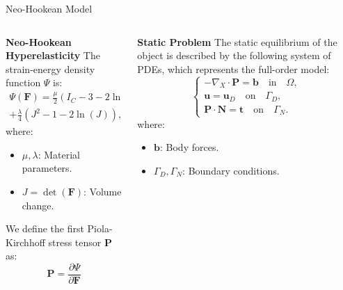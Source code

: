 \documentclass[9pt]{beamer}
\begin{document}
\begin{frame}{Neo-Hookean Model}
    \begin{columns}[T]
        \begin{column}{0.5\textwidth}
            \textbf{Neo-Hookean Hyperelasticity}
                The strain-energy density function $\Psi$ is:
                \[
\begin{split}
                        \Psi(\bm{F}) = \frac{\mu}{2} (I_C - 3 - 2\ln(J))\\ + \frac{\lambda}{4} (J^2 - 1 - 2\ln(J)),
\end{split}                \]
                where:
                \begin{itemize}
                    \item \(\mu, \lambda\): Material parameters.
                    \item \(J = \det(\bm{F})\): Volume change.
                \end{itemize}
                We define the first Piola-Kirchhoff stress tensor \(\bm{P}\) as:
                \[
                    \bm{P} = \frac{\partial \Psi}{\partial \bm{F}} 
                \]
        \end{column}
        \begin{column}{0.5\textwidth}
            \textbf{Static Problem}
                The static equilibrium of the object is described by the following system of PDEs, which represents the full-order model:
                \begin{equation}
                    \begin{cases}
                        - \nabla_X \cdot \bm{P} = \bm{b} \quad \text{in} \quad \Omega, \\
                        \bm{u} = \bm{u}_D \quad \text{on} \quad \Gamma_D, \\
                        \bm{P} \cdot \bm{N} = \bm{t} \quad \text{on} \quad \Gamma_N.
                    \end{cases}
                    \label{eq:static_problem}
                \end{equation}
                where:
                \begin{itemize}
                    \item \(\bm{b}\): Body forces.
                    \item \(\Gamma_D, \Gamma_N\): Boundary conditions.
                \end{itemize}
        \end{column}
    \end{columns}
\end{frame}
\end{document}
